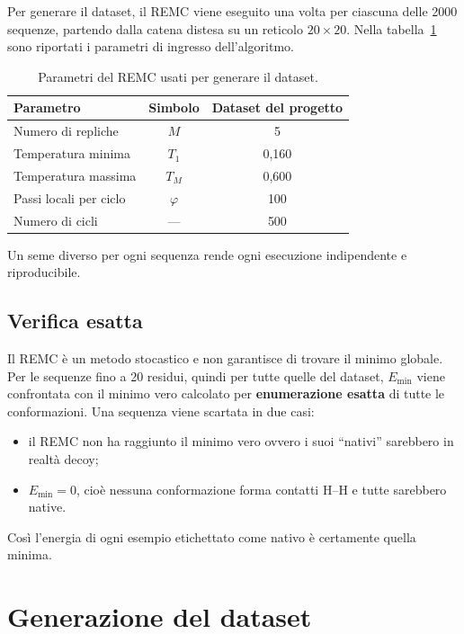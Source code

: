 \documentclass[11pt,a4paper]{article}
\newcommand{\Emin}{E_{\min}}
\begin{document}
Per generare il dataset, il REMC viene eseguito una volta per ciascuna delle 2000 sequenze, partendo dalla catena distesa su un reticolo $20 \times 20$. Nella tabella~\ref{tab:parametri} sono riportati i parametri di ingresso dell'algoritmo.

\begin{table}[htbp]
  \centering
  \caption{Parametri del REMC usati per generare il dataset.}
  \label{tab:parametri}
  \begin{tabular}{lcc}
    \toprule
    Parametro & Simbolo & Dataset del progetto \\
    \midrule
    Numero di repliche     & $M$       & 5     \\
    Temperatura minima     & $T_1$     & 0,160 \\
    Temperatura massima    & $T_M$     & 0,600 \\
    Passi locali per ciclo & $\varphi$ & 100   \\
    Numero di cicli        & ---       & 500   \\
    \bottomrule
  \end{tabular}
\end{table}

Un seme diverso per ogni sequenza rende ogni esecuzione indipendente e riproducibile.

\subsection{Verifica esatta}
\label{sec:verifica}

Il REMC è un metodo stocastico e non garantisce di trovare il minimo globale. Per le sequenze fino a 20 residui, quindi per tutte quelle del dataset, $\Emin$ viene confrontata con il minimo vero calcolato per \textbf{enumerazione esatta} di tutte le conformazioni. Una sequenza viene scartata in due casi:
\begin{itemize}
  \item il REMC non ha raggiunto il minimo vero ovvero i suoi ``nativi'' sarebbero in realtà decoy;
  \item $\Emin = 0$, cioè nessuna conformazione forma contatti H--H e tutte sarebbero native.
\end{itemize}

Così l'energia di ogni esempio etichettato come nativo è certamente quella minima.

\section{Generazione del dataset}
\label{sec:dataset}
\end{document}
